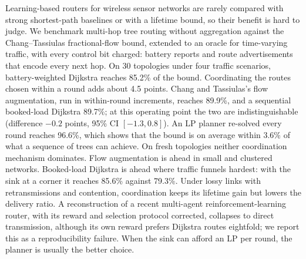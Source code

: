Learning-based routers for wireless sensor networks are rarely compared with strong shortest-path baselines or with a lifetime bound, so their benefit is hard to judge. We benchmark multi-hop tree routing without aggregation against the Chang--Tassiulas fractional-flow bound, extended to an oracle for time-varying traffic, with every control bit charged: battery reports and route advertisements that encode every next hop. On 30 topologies under four traffic scenarios, battery-weighted Dijkstra reaches 85.2\% of the bound. Coordinating the routes chosen within a round adds about 4.5 points. Chang and Tassiulas's flow augmentation, run in within-round increments, reaches 89.9\%, and a sequential booked-load Dijkstra 89.7\%; at this operating point the two are indistinguishable (difference $-0.2$ points, 95\% CI $[-1.3, 0.8]$). An LP planner re-solved every round reaches 96.6\%, which shows that the bound is on average within 3.6\% of what a sequence of trees can achieve. On fresh topologies neither coordination mechanism dominates. Flow augmentation is ahead in small and clustered networks. Booked-load Dijkstra is ahead where traffic funnels hardest: with the sink at a corner it reaches 85.6\% against 79.3\%. Under lossy links with retransmissions and contention, coordination keeps its lifetime gain but lowers the delivery ratio. A reconstruction of a recent multi-agent reinforcement-learning router, with its reward and selection protocol corrected, collapses to direct transmission, although its own reward prefers Dijkstra routes eightfold; we report this as a reproducibility failure. When the sink can afford an LP per round, the planner is usually the better choice.
